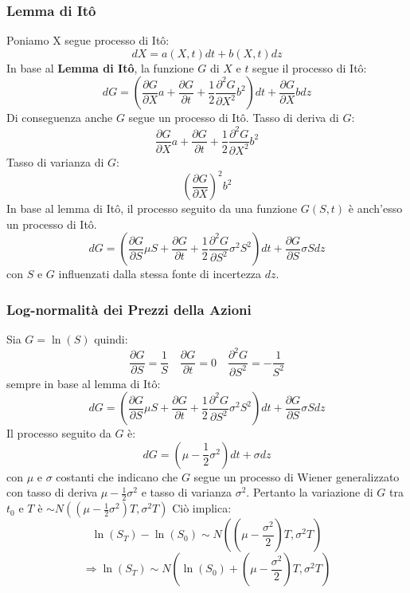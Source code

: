 \documentclass[12pt,a4paper]{report}
\begin{document}
\subsubsection{Lemma di Itô}
Poniamo X segue processo di Itô:
\[
dX = a(X, t)dt + b(X, t)dz
\]
In base al \textbf{Lemma di Itô}, la funzione \( G \) di \( X \) e \( t \) segue il processo di Itô:
\[
dG = \left( \frac{\partial G}{\partial X} a + \frac{\partial G}{\partial t} + \frac{1}{2} \frac{\partial^2 G}{\partial X^2} b^2 \right) dt + \frac{\partial G}{\partial X} b dz
\]
Di conseguenza anche \(G\) segue un processo di Itô.
\newline
Tasso di deriva di \(G\):
\[
\frac{\partial G}{\partial X} a + \frac{\partial G}{\partial t} + \frac{1}{2} \frac{\partial^2 G}{\partial X^2} b^2
\]
Tasso di varianza di \(G\):
\[
\left(\frac{\partial G}{\partial X}\right)^2 b^2
\]
In base al lemma di Itô, il processo seguito da una funzione \( G(S, t) \) è anch'esso un processo di Itô.
\[
dG = \left( \frac{\partial G}{\partial S} \mu S + \frac{\partial G}{\partial t} + \frac{1}{2} \frac{\partial^2 G}{\partial S^2} \sigma^2 S^2\right) dt + \frac{\partial G}{\partial S} \sigma S dz
\]
con \(S\) e \(G\) influenzati dalla stessa fonte di incertezza \(dz\).
\newpage
\subsubsection{Log-normalità dei Prezzi della Azioni}
Sia \(G = \ln(S)\)
quindi:
\[
\frac{\partial G}{\partial S} = \frac{1}{S}
\quad
\frac{\partial G}{\partial t} = 0
\quad
\frac{\partial^2 G}{\partial S^2} = -\frac{1}{S^2}
\]
sempre in base al lemma di Itô:
\[
dG = \left( \frac{\partial G}{\partial S} \mu S + \frac{\partial G}{\partial t} + \frac{1}{2} \frac{\partial^2 G}{\partial S^2} \sigma^2 S^2\right) dt + \frac{\partial G}{\partial S} \sigma S dz
\]
Il processo seguito da \(G\) è:
\[
dG = \left( \mu - \frac{1}{2} \sigma^2 \right) dt + \sigma dz
\]
con \(\mu\) e \(\sigma\) costanti che indicano che \(G\) segue un processo di Wiener generalizzato con tasso di deriva \(\mu - \frac{1}{2} \sigma^2\) e tasso di varianza \(\sigma^2\).
\newline
Pertanto la variazione di \(G\) tra \(t_0\) e \(T\) è \(\sim N\left( \left( \mu - \frac{1}{2} \sigma^2 \right) T, \sigma^2 T \right)\)
\newline
Ciò implica:
\[
\ln(S_T) - \ln(S_0) \sim N\left( \left( \mu - \frac{\sigma^2}{2} \right) T, \sigma^2 T \right)
\]
\[
\Longrightarrow \ln(S_T) \sim N\left( \ln(S_0) + \left( \mu - \frac{\sigma^2}{2} \right) T, \sigma^2 T \right)
\]
\newpage
\end{document}
